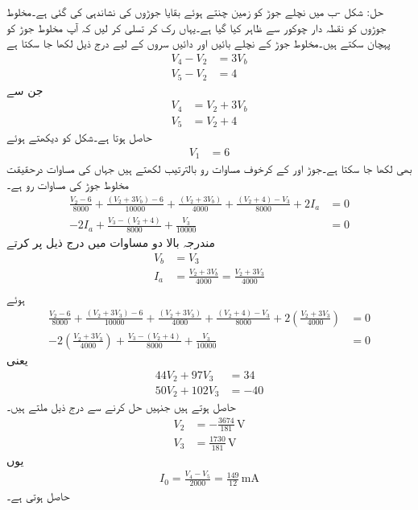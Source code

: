 حل: شکل -ب میں  نچلے جوڑ کو زمین چنتے ہوئے  بقایا جوڑوں کی نشاندہی کی گئی ہے۔مخلوط جوڑوں کو نقطہ دار چوکور سے ظاہر کیا گیا ہے۔یہاں رک کر تسلی کر لیں کہ آپ مخلوط جوڑ کو پہچان سکتے ہیں۔مخلوط جوڑ کے نچلے بائیں اور دائیں سروں کے لیے درج ذیل لکھا جا سکتا ہے
\begin{align*}
V_4-V_2&=3V_b\\
V_5-V_2&=4
\end{align*}
جن  سے
\begin{align*}
V_4&=V_2+3V_b\\
V_5&=V_2+4
\end{align*}
حاصل ہوتا ہے۔شکل کو دیکھتے ہوئے
\begin{align*}
V_1&=6
\end{align*}
بھی لکھا جا سکتا ہے۔جوڑ  اور  کے کرخوف مساوات رو بالترتیب لکھتے ہیں جہاں  کی مساوات درحقیقت مخلوط جوڑ کی مساوات رو ہے۔
\begin{align*}
\frac{V_2-6}{8000}+\frac{(V_2+3V_b)-6}{10000}+\frac{(V_2+3V_b)}{4000}+\frac{(V_2+4)-V_3}{8000}+2I_a&=0\\
-2I_a+\frac{V_3-(V_2+4)}{8000}+\frac{V_3}{10000}&=0
\end{align*}
مندرجہ بالا دو مساوات میں درج ذیل پر کرتے
\begin{align*}
V_b&=V_3\\
I_a&=\frac{V_2+3V_b}{4000}=\frac{V_2+3V_3}{4000}\\
\end{align*}
ہوئے
\begin{align*}
\frac{V_2-6}{8000}+\frac{(V_2+3V_3)-6}{10000}+\frac{(V_2+3V_3)}{4000}+\frac{(V_2+4)-V_3}{8000}+2\left(\frac{V_2+3V_3}{4000}\right)&=0\\
-2\left(\frac{V_2+3V_3}{4000}\right)+\frac{V_3-(V_2+4)}{8000}+\frac{V_3}{10000}&=0
\end{align*}
یعنی
\begin{align*}
44V_2+97V_3&=34\\
50V_2+102V_3&=-40
\end{align*}
حاصل ہوتے ہیں جنہیں حل کرنے سے درج ذیل ملتے ہیں۔
\begin{align*}
V_2&=-\frac{3674}{181} \, \si{\volt}\\
V_3&=\frac{1730}{181} \, \si{\volt}
\end{align*}
یوں
\begin{align*}
I_0=\frac{V_4-V_5}{2000}=\frac{149}{12}\,\si{\milli\ampere}
\end{align*}
حاصل ہوتی ہے۔

